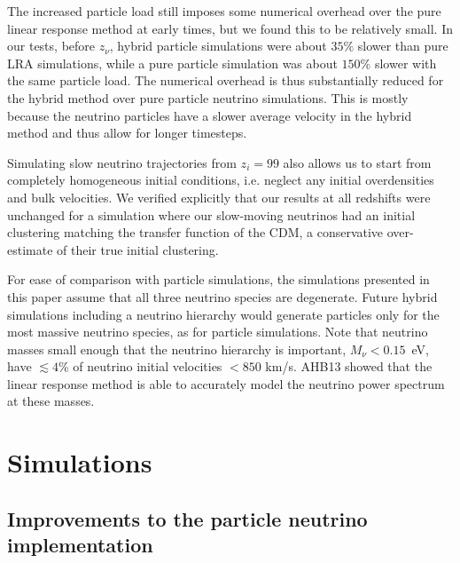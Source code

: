 \documentclass[useAMS, usenatbib]{mnras}
\begin{document}
The increased particle load still imposes some numerical overhead over the pure linear response method at early times, but we found this to be relatively small. In our tests, before $z_\nu$, hybrid particle simulations were about $35\%$ slower than pure LRA simulations, while a pure particle simulation was about $150\%$ slower with the same particle load.
The numerical overhead is thus substantially reduced for the hybrid method over pure particle neutrino simulations. This is mostly because the neutrino particles have a slower average velocity in the hybrid method and thus allow for longer timesteps.

Simulating slow neutrino trajectories from $z_i = 99$ also allows us to start from completely homogeneous initial conditions, i.e. neglect any initial overdensities and bulk velocities. We verified explicitly that our results at all redshifts were unchanged for a simulation where our slow-moving neutrinos had an initial clustering matching the transfer function of the CDM, a conservative over-estimate of their true initial clustering.

For ease of comparison with particle simulations, the simulations presented in this paper assume that all three neutrino species are degenerate. Future hybrid simulations including a neutrino hierarchy would generate particles only for the most massive neutrino species, as for particle simulations. Note that neutrino masses small enough that the neutrino hierarchy is important, $M_\nu < 0.15$~eV, have $\lesssim 4$\% of neutrino initial velocities $< 850$ km/s. AHB13 showed that the linear response method is able to accurately model the neutrino power spectrum at these masses.



\section{Simulations} \label{sec:simulations}


\subsection{Improvements to the particle neutrino implementation}
\end{document}
